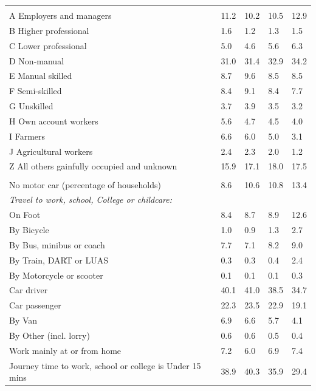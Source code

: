 \documentclass{article}
\begin{document}
\begin{table}[h]
\begin{tabular}{KTTTT}
\hline
    \\ 
    \hline
A Employers and managers & 11.2& 10.2& 10.5& 12.9\\
B Higher professional & 1.6& 1.2& 1.3& 1.5\\
C Lower professional & 5.0& 4.6& 5.6& 6.3\\
D Non-manual & 31.0& 31.4& 32.9& 34.2\\
E Manual skilled & 8.7& 9.6& 8.5& 8.5\\
F Semi-skilled & 8.4& 9.1& 8.4& 7.7\\
G Unskilled & 3.7& 3.9& 3.5& 3.2\\
H Own account workers & 5.6& 4.7& 4.5& 4.0\\
I Farmers & 6.6& 6.0& 5.0& 3.1\\
J Agricultural workers & 2.4& 2.3& 2.0& 1.2\\
Z All others gainfully occupied and unknown & 15.9& 17.1& 18.0& 17.5\\
\hline
{}\hline
    \\ 
    \hline
No motor car (percentage of households) &  8.6& 10.6& 10.8& 
13.4\\
    \hline 
\emph{Travel to work, school, College or childcare:} & & & \\
\quad On Foot &  8.4&  8.7&  8.9& 12.6\\ 
\quad By Bicycle & 1.0& 0.9& 1.3& 2.7\\ 
\quad By Bus, minibus or coach & 7.7& 7.1& 8.2& 9.0\\
\quad By Train, DART or LUAS & 0.3& 0.3& 0.4& 2.4\\
\quad By Motorcycle or scooter & 0.1& 0.1& 0.1& 0.3\\
\quad Car driver & 40.1 & 41.0& 38.5& 34.7\\
\quad Car passenger & 22.3& 23.5& 22.9& 19.1\\
\quad By Van & 6.9& 6.6& 5.7& 4.1\\
\quad By Other (incl. lorry) & 0.6& 0.6& 0.5& 0.4\\
    \hline
Work mainly at or from home & 7.2& 6.0& 6.9& 7.4\\
Journey time to work, school or college is Under 15 mins & 38.9& 40.3& 35.9& 29.4\\

\end{tabular}
\end{table}
\end{document}
